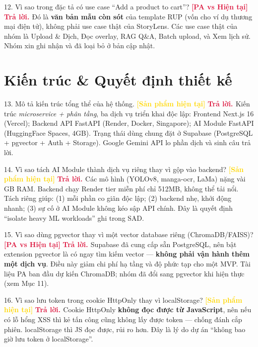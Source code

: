 \documentclass[11pt]{article}
\newcommand{\tagSP}{\textcolor{gold}{\footnotesize\textbf{[Sản phẩm hiện tại]}}}
\newcommand{\tagBoth}{\textcolor{crimson}{\footnotesize\textbf{[PA vs Hiện tại]}}}
\newcommand{\A}{\textbf{\textcolor{crimson}{Trả lời. }}}
\begin{document}
\begin{qa}{12. Vì sao trong đặc tả có use case ``Add a product to cart''? \tagBoth}
\A Đó là \textbf{văn bản mẫu còn sót} của template RUP (vốn cho ví dụ thương mại điện tử), không phải use case thật của StoryLens. Các use case thật của nhóm là Upload \& Dịch, Đọc overlay, RAG Q\&A, Batch upload, và Xem lịch sử. Nhóm xin ghi nhận và đã loại bỏ ở bản cập nhật.
\end{qa}

\section{Kiến trúc \& Quyết định thiết kế}

\begin{qa}{13. Mô tả kiến trúc tổng thể của hệ thống. \tagSP}
\A Kiến trúc \textit{microservice + phân tầng}, ba dịch vụ triển khai độc lập: Frontend Next.js 16 (Vercel); Backend API FastAPI (Render, Docker, Singapore); AI Module FastAPI (HuggingFace Spaces, \raisebox{0.2ex}{$\sim$}4GB). Trạng thái dùng chung đặt ở Supabase (PostgreSQL + pgvector + Auth + Storage). Google Gemini API lo phần dịch và sinh câu trả lời.
\end{qa}

\begin{qa}{14. Vì sao tách AI Module thành dịch vụ riêng thay vì gộp vào backend? \tagSP}
\A Các mô hình (YOLOv8, manga-ocr, LaMa) nặng vài GB RAM. Backend chạy Render tier miễn phí chỉ 512MB, không thể tải nổi. Tách riêng giúp: (1) mỗi phần co giãn độc lập; (2) backend nhẹ, khởi động nhanh; (3) sự cố ở AI Module không kéo sập API chính. Đây là quyết định ``isolate heavy ML workloads'' ghi trong SAD.
\end{qa}

\begin{qa}{15. Vì sao dùng pgvector thay vì một vector database riêng (ChromaDB/FAISS)? \tagBoth}
\A Supabase đã cung cấp sẵn PostgreSQL, nên bật extension pgvector là có ngay tìm kiếm vector --- \textbf{không phải vận hành thêm một dịch vụ}. Điều này giảm chi phí hạ tầng và độ phức tạp cho một MVP. Tài liệu PA ban đầu dự kiến ChromaDB; nhóm đã đổi sang pgvector khi hiện thực (xem Mục 11).
\end{qa}

\begin{qa}{16. Vì sao lưu token trong cookie HttpOnly thay vì localStorage? \tagSP}
\A Cookie HttpOnly \textbf{không đọc được từ JavaScript}, nên nếu có lỗ hổng XSS thì kẻ tấn công cũng không lấy được token --- chống đánh cắp phiên. localStorage thì JS đọc được, rủi ro hơn. Đây là lý do dự án ``không bao giờ lưu token ở localStorage''.
\end{qa}
\end{document}
